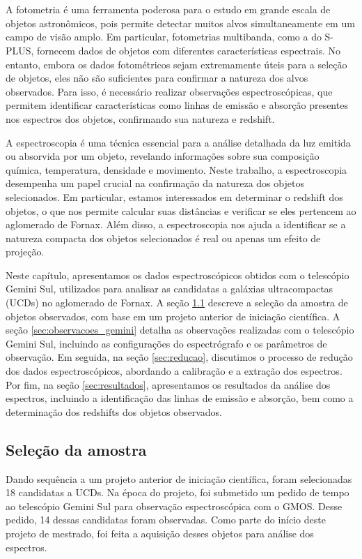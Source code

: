 \chapter{\chapternamespectra}\label{chap:spectra}
A fotometria é uma ferramenta poderosa para o estudo em grande escala de objetos astronômicos, pois permite detectar muitos alvos simultaneamente em um campo de visão amplo. Em particular, fotometrias multibanda, como a do S-PLUS, fornecem dados de objetos com diferentes características espectrais. No entanto, embora os dados fotométricos sejam extremamente úteis para a seleção de objetos, eles não são suficientes para confirmar a natureza dos alvos observados. Para isso, é necessário realizar observações espectroscópicas, que permitem identificar características como linhas de emissão e absorção presentes nos espectros dos objetos, confirmando sua natureza e redshift.

A espectroscopia é uma técnica essencial para a análise detalhada da luz emitida ou absorvida por um objeto, revelando informações sobre sua composição química, temperatura, densidade e movimento. Neste trabalho, a espectroscopia desempenha um papel crucial na confirmação da natureza dos objetos selecionados. Em particular, estamos interessados em determinar o redshift dos objetos, o que nos permite calcular suas distâncias e verificar se eles pertencem ao aglomerado de Fornax. Além disso, a espectroscopia nos ajuda a identificar se a natureza compacta dos objetos selecionados é real ou apenas um efeito de projeção.

Neste capítulo, apresentamos os dados espectroscópicos obtidos com o telescópio Gemini Sul, utilizados para analisar as candidatas a galáxias ultracompactas (UCDs) no aglomerado de Fornax.
A seção \ref{sec:selecao_amostra} descreve a seleção da amostra de objetos observados, com base em um projeto anterior de iniciação científica. A seção \ref{sec:observacoes_gemini} detalha as observações realizadas com o telescópio Gemini Sul, incluindo as configurações do espectrógrafo e os parâmetros de observação. Em seguida, na seção \ref{sec:reducao}, discutimos o processo de redução dos dados espectroscópicos, abordando a calibração e a extração dos espectros. Por fim, na seção \ref{sec:resultados}, apresentamos os resultados da análise dos espectros, incluindo a identificação das linhas de emissão e absorção, bem como a determinação dos redshifts dos objetos observados.

\section{Seleção da amostra}\label{sec:selecao_amostra}
Dando sequência a um projeto anterior de iniciação científica, foram selecionadas 18 candidatas a UCDs. Na época do projeto, foi submetido um pedido de tempo ao telescópio Gemini Sul para observação espectroscópica com o GMOS. Desse pedido, 14 dessas candidatas foram observadas. Como parte do início deste projeto de mestrado, foi feita a aquisição desses objetos para análise dos espectros.

